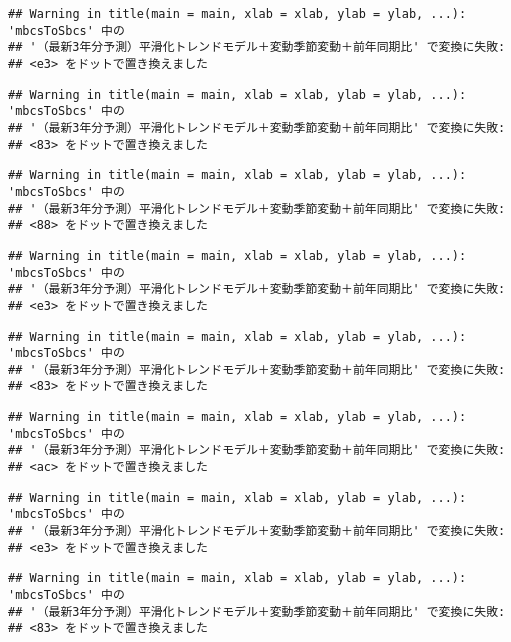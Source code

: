 \documentclass[]{article}
\begin{document}
\begin{verbatim}
## Warning in title(main = main, xlab = xlab, ylab = ylab, ...): 'mbcsToSbcs' 中の
## '（最新3年分予測）平滑化トレンドモデル＋変動季節変動＋前年同期比' で変換に失敗:
## <e3> をドットで置き換えました
\end{verbatim}

\begin{verbatim}
## Warning in title(main = main, xlab = xlab, ylab = ylab, ...): 'mbcsToSbcs' 中の
## '（最新3年分予測）平滑化トレンドモデル＋変動季節変動＋前年同期比' で変換に失敗:
## <83> をドットで置き換えました
\end{verbatim}

\begin{verbatim}
## Warning in title(main = main, xlab = xlab, ylab = ylab, ...): 'mbcsToSbcs' 中の
## '（最新3年分予測）平滑化トレンドモデル＋変動季節変動＋前年同期比' で変換に失敗:
## <88> をドットで置き換えました
\end{verbatim}

\begin{verbatim}
## Warning in title(main = main, xlab = xlab, ylab = ylab, ...): 'mbcsToSbcs' 中の
## '（最新3年分予測）平滑化トレンドモデル＋変動季節変動＋前年同期比' で変換に失敗:
## <e3> をドットで置き換えました
\end{verbatim}

\begin{verbatim}
## Warning in title(main = main, xlab = xlab, ylab = ylab, ...): 'mbcsToSbcs' 中の
## '（最新3年分予測）平滑化トレンドモデル＋変動季節変動＋前年同期比' で変換に失敗:
## <83> をドットで置き換えました
\end{verbatim}

\begin{verbatim}
## Warning in title(main = main, xlab = xlab, ylab = ylab, ...): 'mbcsToSbcs' 中の
## '（最新3年分予測）平滑化トレンドモデル＋変動季節変動＋前年同期比' で変換に失敗:
## <ac> をドットで置き換えました
\end{verbatim}

\begin{verbatim}
## Warning in title(main = main, xlab = xlab, ylab = ylab, ...): 'mbcsToSbcs' 中の
## '（最新3年分予測）平滑化トレンドモデル＋変動季節変動＋前年同期比' で変換に失敗:
## <e3> をドットで置き換えました
\end{verbatim}

\begin{verbatim}
## Warning in title(main = main, xlab = xlab, ylab = ylab, ...): 'mbcsToSbcs' 中の
## '（最新3年分予測）平滑化トレンドモデル＋変動季節変動＋前年同期比' で変換に失敗:
## <83> をドットで置き換えました
\end{verbatim}
\end{document}
